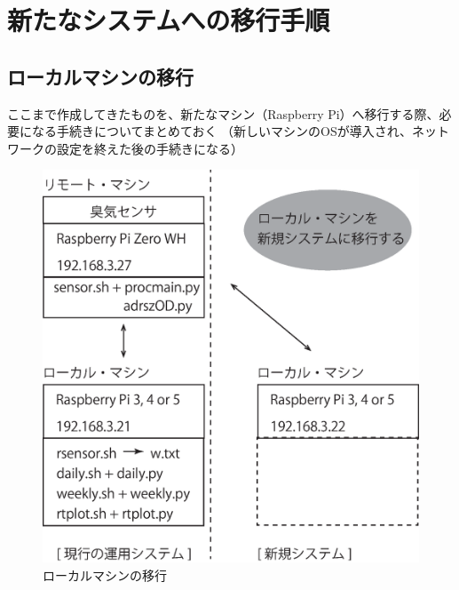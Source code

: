 \documentclass[12pt,a4paper,uplatex]{jsarticle}
\begin{document}
\newpage

\section{新たなシステムへの移行手順}

\subsection{ローカルマシンの移行}

ここまで作成してきたものを、新たなマシン（Raspberry Pi）へ移行する際、必要になる手続きについてまとめておく
（新しいマシンのOSが導入され、ネットワークの設定を終えた後の手続きになる）

\begin{figure}[htbp]
	\begin{minipage}[b]{1.0\linewidth}
		\centering
		\includegraphics[keepaspectratio, scale=0.4]{figs/eps/ikou.eps}
		\caption{ローカルマシンの移行}
	\end{minipage}
\end{figure}
\end{document}
